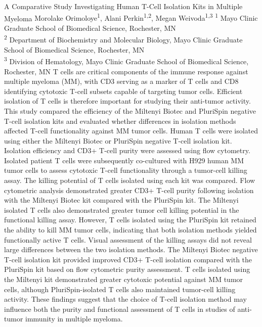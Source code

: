 \makeabstract
    {
    A Comparative Study Investigating Human T-Cell Isolation Kits in Multiple Myeloma
    }
    {
    Morolake Orimoloye\textsuperscript{1}, Alani Perkin\textsuperscript{1,2}, Megan Weivoda\textsuperscript{1,3}
    }
    {
    \textsuperscript{1} Mayo Clinic Graduate School of Biomedical Science, Rochester, MN\\
\textsuperscript{2} Department of Biochemistry and Molecular Biology, Mayo Clinic Graduate School of Biomedical Science, Rochester, MN\\
\textsuperscript{3} Division of Hematology, Mayo Clinic Graduate School of Biomedical Science, Rochester, MN
    }
    {
    T cells are critical components of the immune response against multiple myeloma (MM), with CD3 serving as a marker of T cells and CD8 identifying cytotoxic T-cell subsets capable of targeting tumor cells. Efficient isolation of T cells is therefore important for studying their anti-tumor activity. This study compared the efficiency of the Miltenyi Biotec and PluriSpin negative T-cell isolation kits and evaluated whether differences in isolation methods affected T-cell functionality against MM tumor cells.
    }
    {
    Human T cells were isolated using either the Miltenyi Biotec or PluriSpin negative T-cell isolation kit. Isolation efficiency and CD3+ T-cell purity were assessed using flow cytometry. Isolated patient T cells were subsequently co-cultured with H929 human MM tumor cells to assess cytotoxic T-cell functionality through a tumor-cell killing assay. The killing potential of T cells isolated using each kit was compared.
    }
    {
    Flow cytometric analysis demonstrated greater CD3+ T-cell purity following isolation with the Miltenyi Biotec kit compared with the PluriSpin kit. The Miltenyi isolated T cells also demonstrated greater tumor cell killing potential in the functional killing assay. However, T cells isolated using the PluriSpin kit retained the ability to kill MM tumor cells, indicating that both isolation methods yielded functionally active T cells. Visual assessment of the killing assays did not reveal large differences between the two isolation methods.
    }
    {
    The Miltenyi Biotec negative T-cell isolation kit provided improved CD3+ T-cell isolation compared with the PluriSpin kit based on flow cytometric purity assessment. T cells isolated using the Miltenyi kit demonstrated greater cytotoxic potential against MM tumor cells, although PluriSpin-isolated T cells also maintained tumor-cell killing activity. These findings suggest that the choice of T-cell isolation method may influence both the purity and functional assessment of T cells in studies of anti-tumor immunity in multiple myeloma.
    }

    \newpage
    